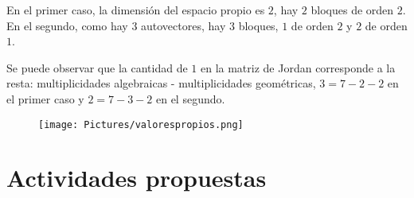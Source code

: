 \begin{example}
\bigskip

En el primer caso, la dimensión del espacio propio  es $2$, hay $2$ bloques de orden $2$. En el segundo,  como hay $3$ autovectores, hay $3$ bloques, $1$ de orden $2$ y $2$ de orden $1$.

\bigskip

Se puede observar que la cantidad de $1$ en la matriz de Jordan corresponde a la resta: multiplicidades algebraicas - multiplicidades geométricas, $3= 7 - 2-2 $ en el primer caso y $2= 7 -3-2$ en el segundo.

\end{example}



\bigskip


\newpage


\begin{figure}
    \centering
    \texttt{[image: Pictures/valorespropios.png]} 
  
    \label{TLfig11}
\end{figure}



\section{Actividades propuestas}




